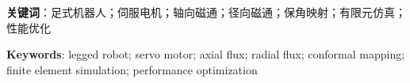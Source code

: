 \documentclass[\main/main.tex]{subfiles}
\begin{document}

\zhlipsum[1-2]

\noindent\textbf{关键词}：足式机器人；伺服电机；轴向磁通；径向磁通；保角映射；有限元仿真；性能优化

\blankpage


\lipsum[1-2]

\noindent\textbf{Keywords}: legged robot; servo motor; axial flux; radial flux; conformal mapping; finite element simulation; performance optimization


\blankpage
\end{document}
